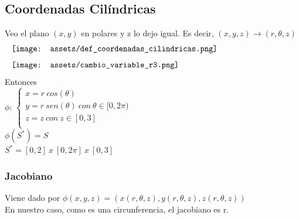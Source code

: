 \documentclass[10pt,a4paper]{article}
\begin{document}
\subsection*{Coordenadas Cilíndricas}
Veo el plano $(x,y)$ en polares y z lo dejo igual. Es decir, $(x,y,z) \rightarrow (r, \theta, z)$ 
\[\begin{minipage}[b]{1\textwidth}
    \texttt{[image: assets/def\_coordenadas\_cilindricas.png]}
\end{minipage}\]
\[\begin{minipage}[b]{1\textwidth}
    \texttt{[image: assets/cambio\_variable\_r3.png]}
\end{minipage}\]
Entonces \\
$\phi$: 
$\begin{cases}
    x = r \ cos (\theta) \\
    y = r \ sen (\theta) \ con \ \theta \in [0, 2 \pi)\\
    z = z   \ con \ z \in [0, 3] \\

\end{cases}$ \\
$ \phi(S^{*}) = S$ \\
$S^{*} = [0,2] \ x \ [0, 2\pi] \ x \ [0, 3]$
\subsubsection*{Jacobiano}
Viene dado por $\phi(x,y,z) = (x(r, \theta, z), y(r, \theta, z), z(r, \theta, z))$ \\
En nuestro caso, como es una circunferencia, el jacobiano es r.
\end{document}
